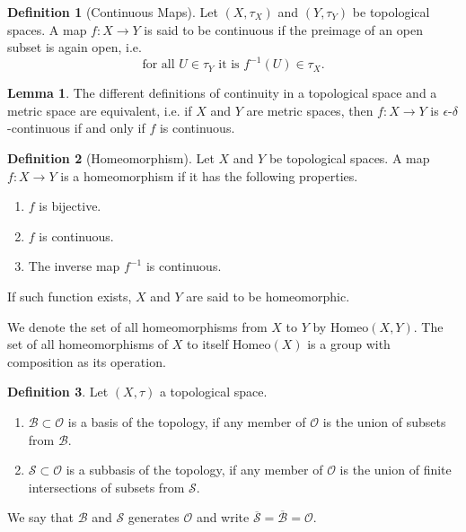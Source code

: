\documentclass[a4paper]{book}
\theoremstyle{definition}
\newtheorem{definition}{Definition}[chapter]
\newtheorem{lemma}{Lemma}[definition]
\begin{document}
    \begin{definition}[Continuous Maps]
        Let \((X, \tau_X)\) and \((Y, \tau_Y)\) be {\color{mathif}topological spaces}. A {\color{mathif}map} \(f: X \longrightarrow Y\) is said to be {\color{maththen}continuous} if the preimage of an open subset is again open, i.e.
        \begin{equation}
            \text{for all } U \in \tau_Y \text{ it is } f^{-1}(U) \in \tau_X \text{.}
        \end{equation}
    \end{definition}

    \begin{lemma}
        The different definitions of continuity in a topological space and a metric space are equivalent, i.e. if \(X\) and \(Y\) are metric spaces, then \(f: X \longrightarrow Y\) is \(\epsilon\)-\(\delta\)-continuous if and only if \(f\) is continuous.
    \end{lemma}

    \begin{definition}[Homeomorphism]
        Let \(X\) and \(Y\) be topological spaces. A map \(f: X \longrightarrow Y\) is a homeomorphism if it has the following properties.

        \begin{enumerate}
            \item \(f\) is {\color{mathif}bijective}.
            \item \(f\) is {\color{mathif}continuous}.
            \item The inverse map \(f^{-1}\) is {\color{mathif}continuous}.
        \end{enumerate}

        If such function exists, \(X\) and \(Y\) are said to be {\color{maththen}homeomorphic}.

        We denote the set of all homeomorphisms from \(X\) to \(Y\) by \(\mathrm{Homeo}(X, Y)\). The set of all homeomorphisms of \(X\) to itself \(\mathrm{Homeo}(X)\) is a group with composition as its operation.
    \end{definition}

    \begin{definition}
        Let \((X, \tau)\) a {\color{mathif}topological space}.
        \begin{enumerate}
            \item \(\mathcal{B} \subset \mathcal{O}\) is a {\color{maththen}basis} of the topology, if any member of \(\mathcal{O}\) is the {\color{mathif}union of subsets} from \(\mathcal{B}\).
            \item \(\mathcal{S} \subset \mathcal{O}\) is a {\color{maththen}subbasis} of the topology, if any member of \(\mathcal{O}\) is the {\color{mathif}union of finite intersections of subsets} from \(\mathcal{S}\).
        \end{enumerate}
        We say that \(\mathcal{B}\) and \(\mathcal{S}\) {\color{maththen}generates} \(\mathcal{O}\) and write \(\overline{\mathcal{S}} = \overline{\mathcal{B}} = \mathcal{O}\).
    \end{definition}
\end{document}
